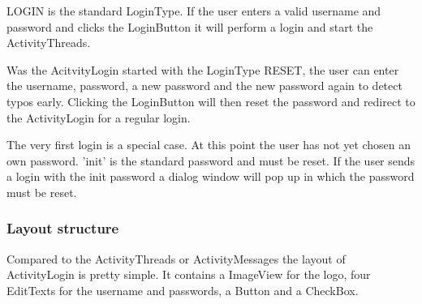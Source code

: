 \documentclass[12pt,a4paper,oneside]{report}
\begin{document}
LOGIN is the standard LoginType. If the user enters a valid username and password and clicks the LoginButton it will perform a login and start the ActivityThreads. 

Was the AcitvityLogin started with the LoginType RESET, the user can enter the username, password, a new password and the new password again to detect typos early. Clicking the LoginButton will then reset the password and redirect to the ActivityLogin for a regular login. 

The very first login is a special case. At this point the user has not yet chosen an own password. 'init' is the standard password and must be reset. If the user sends a login with the init password a dialog window will pop up in which the password must be reset. 

\subsubsection{Layout structure}
Compared to the ActivityThreads or ActivityMessages the layout of ActivityLogin is pretty simple. It contains a ImageView for the logo, four EditTexts for the username and passwords, a Button and a CheckBox.
\end{document}
